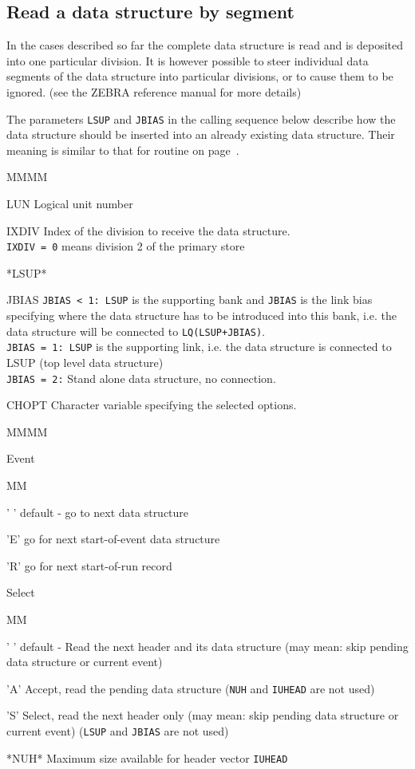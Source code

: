 \subsection{Read a data structure by segment}
\par In the cases described so far the complete data structure is
read and is deposited into one particular division.
It is however possible to steer individual data segments of
the data structure into particular divisions,
or to cause them to be ignored.
(see the ZEBRA reference manual for more details)
\par The parameters {\tt LSUP} and {\tt JBIAS} in the calling sequence below
describe how the data structure should be inserted into
an already existing data structure. Their meaning
is similar to that for routine  on page~\pageref{SR_MZLIFT}.
\Idesc
\begin{DL}{MMMM}
\item[LUN]Logical unit number
\item[IXDIV]Index of the division to receive the data structure.\\
{\tt IXDIV = 0} means division 2 of the primary store
\item[*LSUP*]
\item[JBIAS]{\tt JBIAS < 1: LSUP} is the supporting bank
and {\tt JBIAS} is the link bias specifying where the data structure has to be
introduced into this bank, i.e. the data structure will be connected
to {\tt LQ(LSUP+JBIAS)}.\\
{\tt JBIAS = 1: LSUP} is the supporting link, i.e. the data structure
is connected to LSUP (top level data structure)\\
{\tt JBIAS = 2:} Stand alone data structure, no connection.
\item[CHOPT]Character variable specifying the selected options.
\begin{DL}{MMMM}
\item[Event]
\begin{DL}{MM}
\item[' ']default - go to next data structure
\item['E']go for next start-of-event data structure
\item['R']go for next start-of-run record
\end{DL}
\item[Select]
\begin{DL}{MM}
\item[' ']default - Read the next header and its data structure
(may mean: skip pending data structure or current event)
\item['A']Accept, read the pending data structure
({\tt NUH} and {\tt IUHEAD} are not used)
\item['S']Select, read the next header only
(may mean: skip pending data structure or current event)
({\tt LSUP} and {\tt JBIAS} are not used)
\end{DL}
\end{DL}
\item[*NUH*]Maximum size available for header vector {\tt IUHEAD}
\end{DL}
